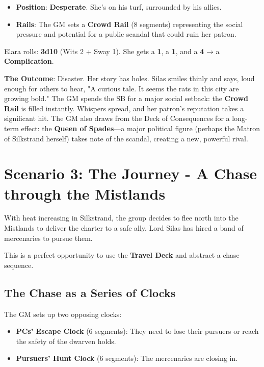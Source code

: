 \begin{itemize}
    \item \textbf{Position}: \textbf{Desperate}. She's on his turf, surrounded by his allies.
    \item \textbf{Rails}: The GM sets a \textbf{Crowd Rail} (8 segments) representing the social pressure and potential for a public scandal that could ruin her patron.
\end{itemize}

Elara rolls: \textbf{3d10} (Wits 2 + Sway 1). She gets a \textbf{1}, a \textbf{1}, and a \textbf{4} → a \textbf{Complication}.

\textbf{The Outcome}: Disaster. Her story has holes. Silas smiles thinly and says, loud enough for others to hear, "A curious tale. It seems the rats in this city are growing bold." The GM spends the SB for a major social setback: the \textbf{Crowd Rail} is filled instantly. Whispers spread, and her patron's reputation takes a significant hit. The GM also draws from the Deck of Consequences for a long-term effect: the \textbf{Queen of Spades}---a major political figure (perhaps the Matron of Silkstrand herself) takes note of the scandal, creating a new, powerful rival.

\section*{Scenario 3: The Journey - A Chase through the Mistlands}

With heat increasing in Silkstrand, the group decides to flee north into the Mistlands to deliver the charter to a safe ally. Lord Silas has hired a band of mercenaries to pursue them.

This is a perfect opportunity to use the \textbf{Travel Deck} and abstract a chase sequence.

\subsection*{The Chase as a Series of Clocks}

The GM sets up two opposing clocks:
\begin{itemize}
    \item \textbf{PCs' Escape Clock} (6 segments): They need to lose their pursuers or reach the safety of the dwarven holds.
    \item \textbf{Pursuers' Hunt Clock} (6 segments): The mercenaries are closing in.
\end{itemize}


